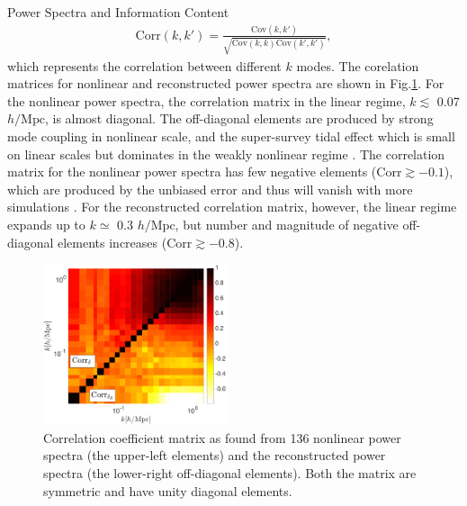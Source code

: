 \begin{section}{Power Spectra and Information Content}
\begin{align}
    \mathrm{Corr}\left(k,k'\right)=\frac{\mathrm{Cov}\left(k,k'\right)}{\sqrt{\mathrm{Cov}\left(k,k\right)\mathrm{Cov}\left(k',k'\right)}},
\end{align}
which represents the correlation between different $k$ modes. 
The corelation matrices for nonlinear and reconstructed power spectra 
are shown in Fig.\ref{fig:corrall}. For the nonlinear power spectra, the
correlation matrix in the linear regime, $k \lesssim$ 0.07 $h/\mathrm{Mpc}$, is almost diagonal. 
The off-diagonal elements are produced by 
strong mode coupling in nonlinear scale, and the super-survey tidal effect which is small on 
linear scales but dominates in the weakly nonlinear regime \cite{bib:Kazuyuki2016}.
The correlation matrix for the nonlinear power spectra has few negative elements
($\mathrm{Corr} \gtrsim -0.1$), which are produced by the unbiased error and thus 
 will vanish with more simulations \cite{bib:Takahashi2009}.
 For the reconstructed correlation matrix, however, the linear regime expands up to $k \simeq$ 0.3 $h/\mathrm{Mpc}$, 
but number and magnitude of negative off-diagonal elements increases ($\mathrm{Corr} \gtrsim -0.8$). 

\begin{figure}
 \centering
  \includegraphics[width=0.48\textwidth]{corrmat_hot_2-crop.pdf}
  \caption{Correlation coefficient matrix as found from 136 nonlinear power spectra 
(the upper-left elements) and the reconstructed power spectra (the lower-right off-diagonal elements). 
Both the matrix are symmetric and have unity diagonal elements.}
    \label{fig:corrall}
\end{figure}



\end{section}

